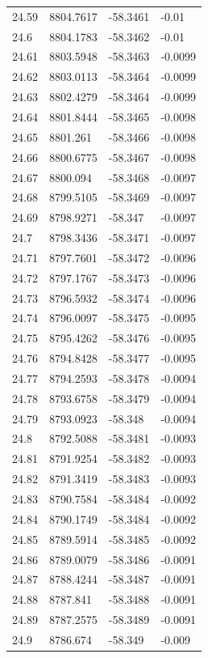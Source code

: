 \begin{table}[H]
\begin{tabular}{llll}
24.59 & 8804.7617 & -58.3461 & -0.01 \\
24.6 & 8804.1783 & -58.3462 & -0.01 \\
24.61 & 8803.5948 & -58.3463 & -0.0099 \\
24.62 & 8803.0113 & -58.3464 & -0.0099 \\
24.63 & 8802.4279 & -58.3464 & -0.0099 \\
24.64 & 8801.8444 & -58.3465 & -0.0098 \\
24.65 & 8801.261 & -58.3466 & -0.0098 \\
24.66 & 8800.6775 & -58.3467 & -0.0098 \\
24.67 & 8800.094 & -58.3468 & -0.0097 \\
24.68 & 8799.5105 & -58.3469 & -0.0097 \\
24.69 & 8798.9271 & -58.347 & -0.0097 \\
24.7 & 8798.3436 & -58.3471 & -0.0097 \\
24.71 & 8797.7601 & -58.3472 & -0.0096 \\
24.72 & 8797.1767 & -58.3473 & -0.0096 \\
24.73 & 8796.5932 & -58.3474 & -0.0096 \\
24.74 & 8796.0097 & -58.3475 & -0.0095 \\
24.75 & 8795.4262 & -58.3476 & -0.0095 \\
24.76 & 8794.8428 & -58.3477 & -0.0095 \\
24.77 & 8794.2593 & -58.3478 & -0.0094 \\
24.78 & 8793.6758 & -58.3479 & -0.0094 \\
24.79 & 8793.0923 & -58.348 & -0.0094 \\
24.8 & 8792.5088 & -58.3481 & -0.0093 \\
24.81 & 8791.9254 & -58.3482 & -0.0093 \\
24.82 & 8791.3419 & -58.3483 & -0.0093 \\
24.83 & 8790.7584 & -58.3484 & -0.0092 \\
24.84 & 8790.1749 & -58.3484 & -0.0092 \\
24.85 & 8789.5914 & -58.3485 & -0.0092 \\
24.86 & 8789.0079 & -58.3486 & -0.0091 \\
24.87 & 8788.4244 & -58.3487 & -0.0091 \\
24.88 & 8787.841 & -58.3488 & -0.0091 \\
24.89 & 8787.2575 & -58.3489 & -0.0091 \\
24.9 & 8786.674 & -58.349 & -0.009 \\

\end{tabular}
\end{table}
